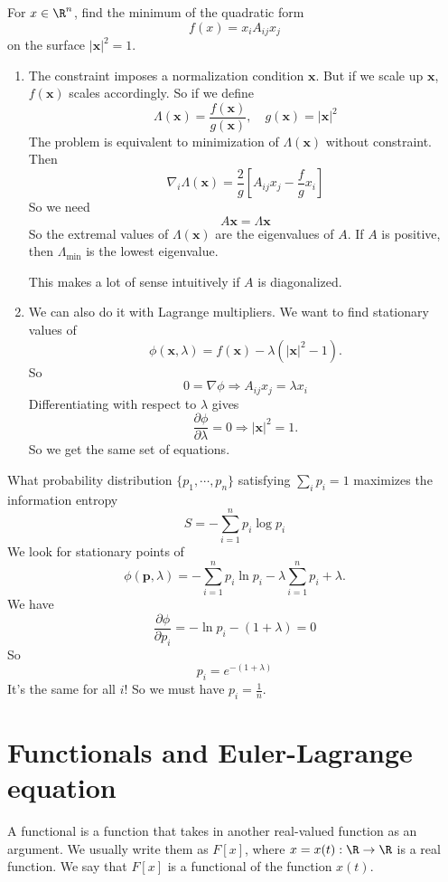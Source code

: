 \documentclass[a4paper]{article}
\begin{document}
\begin{eg}
  For $x\in \R^n$, find the minimum of the quadratic form
  \[
    f(x) = x_i A_{ij}x_j
  \]
  on the surface $|\mathbf{x}|^2 = 1$.

  \begin{enumerate}
  \item The constraint imposes a normalization condition $\mathbf{x}$. But if we scale up $\mathbf{x}$, $f(\mathbf{x})$ scales accordingly. So if we define
    \[
      \Lambda(\mathbf{x}) = \frac{f(\mathbf{x})}{g(\mathbf{x})},\quad g(\mathbf{x}) = |\mathbf{x}|^2
    \]
    The problem is equivalent to minimization of $\Lambda (\mathbf{x})$ without constraint. Then
    \[
      \nabla_i \Lambda(\mathbf{x}) = \frac{2}{g}\left[A_{ij} x_j - \frac{f}{g} x_i\right]
    \]
    So we need
    \[
      A\mathbf{x} = \Lambda \mathbf{x}
    \]
    So the extremal values of $\Lambda (\mathbf{x})$ are the eigenvalues of $A$. If $A$ is positive, then $\Lambda_{\min}$ is the lowest eigenvalue.

    This makes a lot of sense intuitively if $A$ is diagonalized.

  \item We can also do it with Lagrange multipliers. We want to find stationary values of
    \[
      \phi(\mathbf{x}, \lambda) = f(\mathbf{x}) - \lambda(|\mathbf{x}|^2 - 1).
    \]
    So
    \[
      0 = \nabla \phi \Rightarrow  A_{ij} x_j = \lambda x_i
    \]
    Differentiating with respect to $\lambda$ gives
    \[
      \frac{\partial \phi}{\partial \lambda} = 0 \Rightarrow  |\mathbf{x}|^2 = 1.
    \]
    So we get the same set of equations.
  \end{enumerate}
\end{eg}

\begin{eg}
  What probability distribution $\{p_1, \cdots, p_n\}$ satisfying $\sum_i p_i = 1$ maximizes the information entropy
  \[
    S = - \sum_{i = 1}^n p_i \log p_i
  \]
  We look for stationary points of
  \[
    \phi(\mathbf{p}, \lambda) = -\sum_{i = 1}^n p_i \ln p_i - \lambda\sum_{i = 1}^n p_i + \lambda.
  \]
  We have
  \[
    \frac{\partial \phi}{\partial p_i}= - \ln p_i - (1 + \lambda) = 0
  \]
  So
  \[
    p_i = e^{-(1 + \lambda)}
  \]
  It's the same for all $i$! So we must have $p_i = \frac{1}{n}$.
\end{eg}
\section{Functionals and Euler-Lagrange equation}
\begin{defi}[Functional]
  A functional is a function that takes in another real-valued function as an argument. We usually write them as $F[x]$, where $x = x(t): \R \to \R$ is a real function. We say that $F[x]$ is a functional of the function $x(t)$.
\end{defi}
\end{document}
